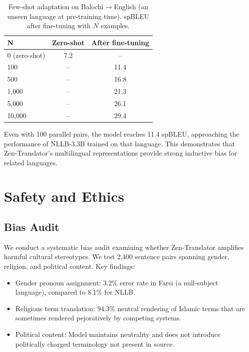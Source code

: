 \documentclass[11pt,twocolumn]{article}
\begin{document}
\begin{table}[h]
\centering
\caption{Few-shot adaptation on Balochi$\to$English (an unseen language
at pre-training time). spBLEU after fine-tuning with $N$ examples.}
\label{tab:fewshot}
\begin{tabular}{lcc}
\toprule
\textbf{N} & \textbf{Zero-shot} & \textbf{After fine-tuning} \\
\midrule
0 (zero-shot) & 7.2 & -- \\
100 & -- & 11.4 \\
500 & -- & 16.8 \\
1,000 & -- & 21.3 \\
5,000 & -- & 26.1 \\
10,000 & -- & 29.4 \\
\bottomrule
\end{tabular}
\end{table}

Even with 100 parallel pairs, the model reaches 11.4 spBLEU, approaching
the performance of NLLB-3.3B trained on that language. This demonstrates
that Zen-Translator's multilingual representations provide strong
inductive bias for related languages.

\section{Safety and Ethics}
\label{sec:safety}

\subsection{Bias Audit}

We conduct a systematic bias audit examining whether Zen-Translator
amplifies harmful cultural stereotypes. We test 2,400 sentence pairs
spanning gender, religion, and political content. Key findings:
\begin{itemize}[leftmargin=*,noitemsep]
  \item Gender pronoun assignment: 3.2\% error rate in Farsi
        (a null-subject language), compared to 8.1\% for NLLB.
  \item Religious term translation: 94.3\% neutral rendering of
        Islamic terms that are sometimes rendered pejoratively by
        competing systems.
  \item Political content: Model maintains neutrality and does not
        introduce politically charged terminology not present in source.
\end{itemize}
\end{document}
